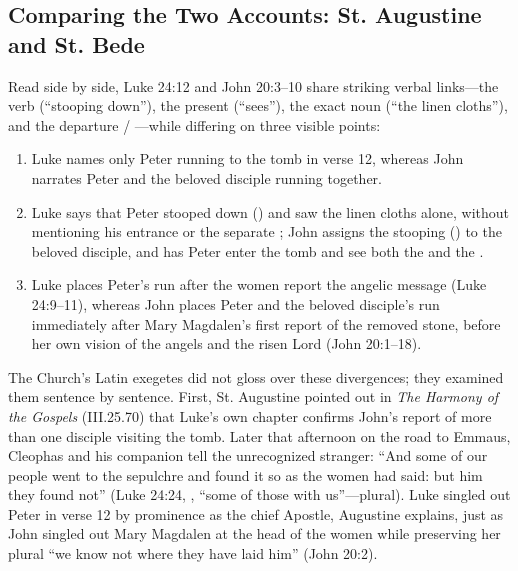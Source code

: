 \subsection{Comparing the Two Accounts: St. Augustine and St. Bede}

Read side by side, Luke 24:12 and John 20:3--10 share striking verbal links---the verb  (``stooping down''), the present  (``sees''), the exact noun  (``the linen cloths''), and the departure  / ---while differing on three visible points:

\begin{enumerate}
\item Luke names only Peter running to the tomb in verse 12, whereas John narrates Peter and the beloved disciple running together.
\item Luke says that Peter stooped down () and saw the linen cloths alone, without mentioning his entrance or the separate ; John assigns the stooping () to the beloved disciple, and has Peter enter the tomb and see both the  and the .
\item Luke places Peter's run after the women report the angelic message (Luke 24:9--11), whereas John places Peter and the beloved disciple's run immediately after Mary Magdalen's first report of the removed stone, before her own vision of the angels and the risen Lord (John 20:1--18).
\end{enumerate}

The Church's Latin exegetes did not gloss over these divergences; they examined them sentence by sentence. First, St. Augustine pointed out in \emph{The Harmony of the Gospels} (III.25.70) that Luke's own chapter confirms John's report of more than one disciple visiting the tomb. Later that afternoon on the road to Emmaus, Cleophas and his companion tell the unrecognized stranger: ``And some of our people went to the sepulchre and found it so as the women had said: but him they found not'' (Luke 24:24, , ``some of those with us''---plural). Luke singled out Peter in verse 12 by prominence as the chief Apostle, Augustine explains, just as John singled out Mary Magdalen at the head of the women while preserving her plural ``we know not where they have laid him'' (John 20:2).

